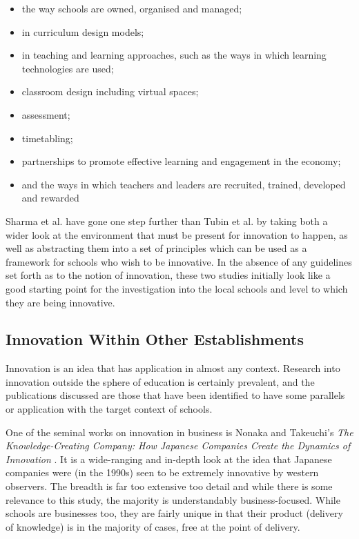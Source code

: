 \begin{itemize}
\item the way schools are owned, organised and managed; 
\item in curriculum design models; 
\item in teaching and learning approaches, such as the ways in which learning technologies are used; 
\item classroom design including virtual spaces; 
\item assessment; 
\item timetabling; 
\item partnerships to promote effective learning and engagement in the economy; 
\item and the ways in which teachers and leaders are recruited, trained, developed and rewarded
\end{itemize}

Sharma et al. have gone one step further than Tubin et al. by taking both a wider look at the environment that must be present for innovation to happen, as well as abstracting them into a set of principles which can be used as a framework for schools who wish to be innovative. In the absence of any guidelines set forth as to the notion of innovation, these two studies initially look like a good starting point for the investigation into the local schools and level to which they are being innovative.

\subsection{Innovation Within Other Establishments}
Innovation is an idea that has application in almost any context. Research into innovation outside the sphere of education is certainly prevalent, and the publications discussed are those that have been identified to have some parallels or application with the target context of schools.

One of the seminal works on innovation in business is Nonaka and Takeuchi's \textit{The Knowledge-Creating Company: How Japanese Companies Create the Dynamics of Innovation} \citet{nonaka1995knowledge}. It is a wide-ranging and in-depth look at the idea that Japanese companies were (in the 1990s) seen to be extremely innovative by western observers. The breadth is far too extensive too detail and while there is some relevance to this study, the majority is understandably business-focused. While schools are businesses too, they are fairly unique in that their product (delivery of knowledge) is in the majority of cases, free at the point of delivery.

